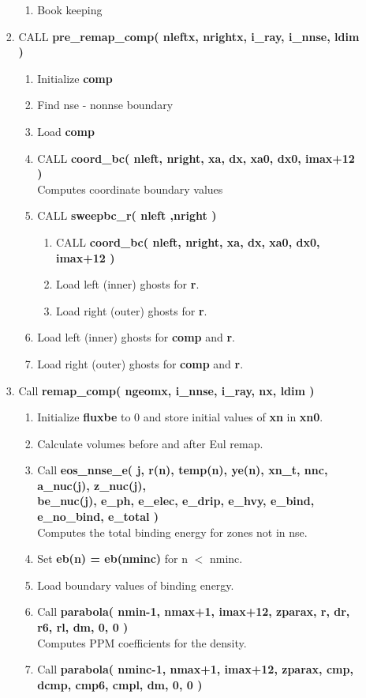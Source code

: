 \documentclass[11pt,doublespace]{article}
\begin{document}
\begin{itemize}
\begin{enumerate}
\begin{enumerate}
\begin{enumerate}
  \item Book keeping
\end{enumerate}
  \item CALL {\bf pre\_remap\_comp( nleftx, nrightx, i\_ray, i\_nnse, ldim )}
\begin{enumerate}
  \item Initialize {\bf comp}
  \item Find nse - nonnse boundary
  \item Load {\bf comp}
  \item CALL {\bf coord\_bc( nleft, nright, xa, dx, xa0, dx0, imax+12 )}\\
  Computes coordinate boundary values
  \item CALL {\bf sweepbc\_r( nleft ,nright )}
\begin{enumerate}
  \item CALL {\bf coord\_bc( nleft, nright, xa, dx, xa0, dx0, imax+12 )}
  \item Load left (inner) ghosts for {\bf r}.
  \item Load right (outer) ghosts for {\bf r}.
\end{enumerate}
  \item Load left (inner) ghosts for {\bf comp} and {\bf r}.
  \item Load right (outer) ghosts for {\bf comp} and {\bf r}.
\end{enumerate}
  \item Call {\bf remap\_comp( ngeomx, i\_nnse, i\_ray, nx, ldim )}
\begin{enumerate}
  \item Initialize {\bf fluxbe} to 0 and store initial values of {\bf xn} in {\bf xn0}.
  \item Calculate volumes before and after Eul remap.
  \item Call {\bf eos\_nnse\_e( j, r(n), temp(n), ye(n), xn\_t, nnc, a\_nuc(j), z\_nuc(j),\\
be\_nuc(j), e\_ph, e\_elec, e\_drip, e\_hvy, e\_bind, e\_no\_bind, e\_total )}\\
  Computes the total binding energy for zones not in nse.
  \item Set {\bf eb(n) = eb(nminc)} for n $<$ nminc.
  \item Load boundary values of binding energy.
  \item Call {\bf parabola( nmin-1, nmax+1, imax+12, zparax, r,    dr,  r6,  rl,  dm, 0, 0 )}\\
  Computes PPM coefficients for the density.
  \item Call {\bf parabola( nminc-1, nmax+1, imax+12, zparax, cmp, dcmp, cmp6, cmpl, dm, 0, 0 )}\\

\end{enumerate}
\end{enumerate}
\end{enumerate}
\end{itemize}
\end{document}
